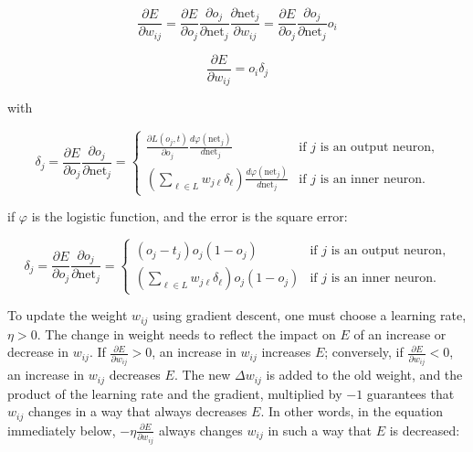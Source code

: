 \begin{equation}
    \label{eq:chain-9}
    {\frac {\partial E}{\partial w_{ij}}}={\frac {\partial E}{\partial o_{j}}}{\frac {\partial o_{j}}{\partial {\text{net}}_{j}}}{\frac {\partial {\text{net}}_{j}}{\partial w_{ij}}}={\frac {\partial E}{\partial o_{j}}}{\frac {\partial o_{j}}{\partial {\text{net}}_{j}}}o_{i}
\end{equation}

\begin{equation}
    \label{eq:chain-10}
    {\frac {\partial E}{\partial w_{ij}}}=o_{i}\delta _{j}
\end{equation}

with

\begin{equation}
    \label{eq:chain-11}
    \delta _{j}={\frac {\partial E}{\partial o_{j}}}{\frac {\partial o_{j}}{\partial {\text{net}}_{j}}}={\begin{cases}{\frac {\partial L(o_{j},t)}{\partial o_{j}}}{\frac {d\varphi ({\text{net}}_{j})}{d{\text{net}}_{j}}}&{\text{if }}j{\text{ is an output neuron,}}\\(\sum _{\ell \in L}w_{j\ell }\delta _{\ell }){\frac {d\varphi ({\text{net}}_{j})}{d{\text{net}}_{j}}}&{\text{if }}j{\text{ is an inner neuron.}}\end{cases}}
\end{equation}

if $\varphi$  is the logistic function, and the error is the square error:

\begin{equation}
    \label{eq:chain-12}
    \delta _{j}={\frac {\partial E}{\partial o_{j}}}{\frac {\partial o_{j}}{\partial {\text{net}}_{j}}}={\begin{cases}(o_{j}-t_{j})o_{j}(1-o_{j})&{\text{if }}j{\text{ is an output neuron,}}\\(\sum _{\ell \in L}w_{j\ell }\delta _{\ell })o_{j}(1-o_{j})&{\text{if }}j{\text{ is an inner neuron.}}\end{cases}}
\end{equation}

To update the weight $w_{ij}$ using gradient descent, one must choose a learning rate, $\eta >0$. The change in weight needs to reflect the impact on $E$ of an increase or decrease in $w_{ij}$. If ${\frac {\partial E}{\partial w_{ij}}}>0$, an increase in $w_{ij}$ increases $E$; conversely, if ${\frac {\partial E}{\partial w_{ij}}}<0$, an increase in $w_{ij}$ decreases $E$. The new $\Delta w_{ij}$ is added to the old weight, and the product of the learning rate and the gradient, multiplied by $-1$ guarantees that $w_{ij}$ changes in a way that always decreases $E$. In other words, in the equation immediately below, $-\eta {\frac {\partial E}{\partial w_{ij}}}$ always changes $w_{ij}$ in such a way that $E$ is decreased:

